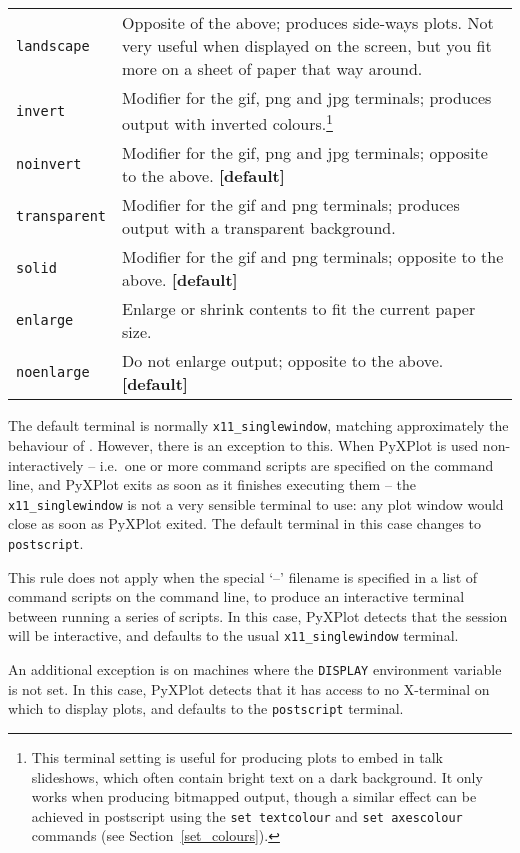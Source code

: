 \begin{longtable}{p{3cm}p{9cm}}
{\tt landscape} & Opposite of the above; produces side-ways plots. Not very useful when displayed on the screen, but you fit more on a sheet of paper that way around.\index{landscape orientation}\\
{\tt invert} & Modifier for the gif, png and jpg terminals; produces output with inverted colours.\footnote{This terminal setting is useful for producing plots to embed in talk slideshows, which often contain bright text on a dark background. It only works when producing bitmapped output, though a similar effect can be achieved in postscript using the {\tt set textcolour} and {\tt set axescolour} commands (see Section~\ref{set_colours}).}\index{colours!inverting}\\
{\tt noinvert} & Modifier for the gif, png and jpg terminals; opposite to the above. {\bf [default]}\\
{\tt transparent} & Modifier for the gif and png terminals; produces output with a transparent background.\index{transparent terminal}\index{gif output!transparency}\index{png output!transparency}\\
{\tt solid} & Modifier for the gif and png terminals; opposite to the above. {\bf [default]}\\
{\tt enlarge} & Enlarge or shrink contents to fit the current paper
size.\index{enlarging output}\\
{\tt noenlarge} & Do not enlarge output; opposite to the above. {\bf [default]}\\
\end{longtable}
\label{terminals}

The default terminal is normally {\tt x11\_singlewindow}, matching
approximately the behaviour of \gnuplot. However, there is an exception to this.
When PyXPlot is used non-interactively -- i.e.\ one or more command scripts are
specified on the command line, and PyXPlot exits as soon as it finishes
executing them -- the {\tt x11\_singlewindow} is not a very sensible
terminal to use: any plot window would close as soon as PyXPlot exited. The
default terminal in this case changes to {\tt postscript}.

This rule does not apply when the special `--' filename is specified in a list
of command scripts on the command line, to produce an interactive terminal
between running a series of scripts. In this case, PyXPlot detects that the
session will be interactive, and defaults to the usual
{\tt x11\_singlewindow} terminal.

An additional exception is on machines where the {\tt DISPLAY} environment
variable is not set. In this case, PyXPlot detects that it has access to no
X-terminal on which to display plots, and defaults to the {\tt postscript}
terminal.

